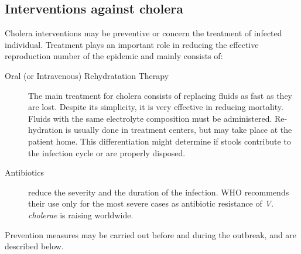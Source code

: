 \subsection{Interventions against cholera} 
Cholera interventions may be preventive or concern the treatment of infected individual. Treatment plays an important role in reducing the effective reproduction number of the epidemic and mainly consists of:
\begin{description}
\item[Oral (or Intravenous) Rehydratation Therapy] The main treatment for cholera consists of replacing fluids as fast as they are lost. Despite its simplicity, it is very effective in reducing mortality. Fluids with the same electrolyte composition must be administered\cite{Kuhn:GlucoseNotRiceBased:2014}.  Re-hydration is usually done in treatment centers, but may take place at the patient home. This differentiation might determine if stools contribute to the infection cycle or are properly disposed.
\item[Antibiotics] reduce the severity and the duration of the infection. WHO recommends their use only for the most severe cases as antibiotic resistance of \emph{V. cholerae} is raising worldwide\cite{Sack:GettingSeriousCholera:2006}.
\end{description}

Prevention measures may be carried out before and during the outbreak, and are described below.


